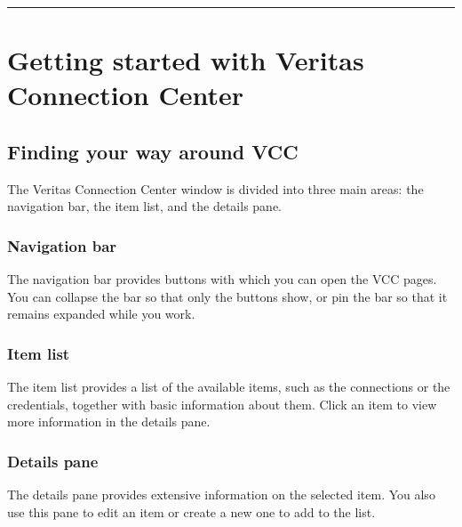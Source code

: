 \documentclass[letterpaper,10pt,english]{sphinxmanual}
\begin{document}
\bigskip\hrule\bigskip



\section{Getting started with Veritas Connection Center}
\label{\detokenize{mcdmp_app_ug:getting-started-with-veritas-connection-center}}

\subsection{Finding your way around VCC}
\label{\detokenize{mcdmp_app_ug:finding-your-way-around-vcc}}
The Veritas Connection Center window is divided into three main areas: the navigation bar, the item list, and the details pane.


\subsubsection{Navigation bar}
\label{\detokenize{mcdmp_app_ug:navigation-bar}}
The navigation bar provides buttons with which you can open the VCC pages. You can collapse the bar so that only the buttons show, or pin the bar so that it remains expanded while you work.
\begin{quote}

\begin{figure}[htbp]
\centering

\noindent{}
\end{figure}
\end{quote}


\subsubsection{Item list}
\label{\detokenize{mcdmp_app_ug:item-list}}
The item list provides a list of the available items, such as the connections or the credentials, together with basic information about them. Click an item to view more information in the details pane.
\begin{quote}

\begin{figure}[htbp]
\centering

\noindent{}
\end{figure}
\end{quote}


\subsubsection{Details pane}
\label{\detokenize{mcdmp_app_ug:details-pane}}
The details pane provides extensive information on the selected item. You also use this pane to edit an item or create a new one to add to the list.
\begin{quote}

\begin{figure}[htbp]
\centering

\noindent{}
\end{figure}
\end{quote}
\end{document}
